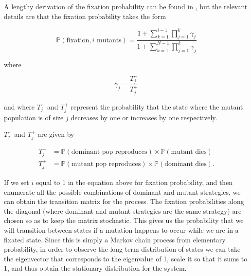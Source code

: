 A lengthy derivation of the fixation probability can be found in \cite{traulsenhauert}, but the relevant details are that the fixation probability takes the form

\begin{equation*}
    \mathbb{P}(\text{fixation}, i \text{ mutants}) = \frac{1 + \sum_{k = 1}^{i - 1}{\prod_{j = 1}^{k}{\gamma_j}}}{1 + \sum_{k = 1}^{N - 1}{\prod_{j = 1}^{k}{\gamma_j}}}
\end{equation*}

where

\begin{equation*}
    \gamma_j = \frac{T_j^-}{T_j^+}
\end{equation*}

and where $T_j^-$ and $T_j^+$ represent the probability that the state where the mutant population is of size $j$ decreases by one or increases by one respectively.

$T_j^-$ and $T_j^+$ are given by

\begin{align*}
    T_j^- & = \mathbb{P}(\text{dominant pop reproduces}) \times \mathbb{P}(\text{mutant dies}) \\
    T_j^+ & = \mathbb{P}(\text{mutant pop reproduces}) \times \mathbb{P}(\text{dominant dies}).
\end{align*}
 
If we set $i$ equal to 1 in the equation above for fixation probability, and then enumerate all the possible combinations of dominant and mutant strategies, we can obtain the transition matrix for the process.
The fixation probabilities along the diagonal (where dominant and mutant strategies are the same strategy) are chosen so as to keep the matrix stochastic.
This gives us the probability that we will transition between states if a mutation happens to occur while we are in a fixated state.
Since this is simply a Markov chain process from elementary probability, in order to observe the long term distribution of states we can take the eigenvector that corresponds to the eigenvalue of 1, scale it so that it sums to 1, and thus obtain the stationary distribution for the system.

